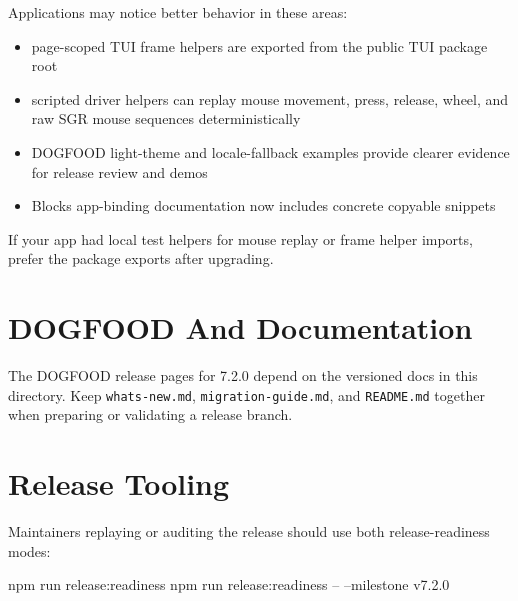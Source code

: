 Applications may notice better behavior in these areas:

\begin{itemize}
\tightlist
\item
  page-scoped TUI frame helpers are exported from the public TUI package root
\item
  scripted driver helpers can replay mouse movement, press, release, wheel, and raw SGR mouse sequences deterministically
\item
  DOGFOOD light-theme and locale-fallback examples provide clearer evidence for release review and demos
\item
  Blocks app-binding documentation now includes concrete copyable snippets
\end{itemize}

If your app had local test helpers for mouse replay or frame helper imports, prefer the package exports after upgrading.

\section{DOGFOOD And Documentation}\label{record-272-dogfood-and-documentation}

The DOGFOOD release pages for 7.2.0 depend on the versioned docs in this directory. Keep \texttt{w\allowbreak{}h\allowbreak{}a\allowbreak{}t\allowbreak{}s\allowbreak{}-\allowbreak{}n\allowbreak{}e\allowbreak{}w\allowbreak{}.\allowbreak{}m\allowbreak{}d}, \texttt{m\allowbreak{}i\allowbreak{}g\allowbreak{}r\allowbreak{}a\allowbreak{}t\allowbreak{}i\allowbreak{}o\allowbreak{}n\allowbreak{}-\allowbreak{}g\allowbreak{}u\allowbreak{}i\allowbreak{}d\allowbreak{}e\allowbreak{}.\allowbreak{}m\allowbreak{}d}, and \texttt{R\allowbreak{}E\allowbreak{}A\allowbreak{}D\allowbreak{}M\allowbreak{}E\allowbreak{}.\allowbreak{}m\allowbreak{}d} together when preparing or validating a release branch.

\section{Release Tooling}\label{record-272-release-tooling}

Maintainers replaying or auditing the release should use both release-readiness modes:

\begin{CodeBlock}
npm run release:readiness
npm run release:readiness -- --milestone v7.2.0
\end{CodeBlock}

